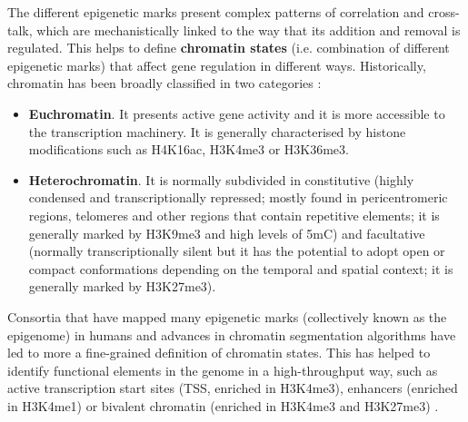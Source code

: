 The different epigenetic marks present complex patterns of correlation and cross-talk, which are mechanistically linked to the way that its addition and removal is regulated. This helps to define \textbf{chromatin states} (i.e. combination of different epigenetic marks) that affect gene regulation in different ways. Historically, chromatin has been broadly classified in two categories \cite{Allis2016,Reinberg2018,Trojer2007}:

\begin{itemize}
	
	\item \textbf{Euchromatin}. It presents active gene activity and it is more accessible to the transcription machinery. It is generally characterised by histone modifications such as H4K16ac, H3K4me3 or H3K36me3.
	
	\item \textbf{Heterochromatin}. It is normally subdivided in constitutive (highly condensed and transcriptionally repressed; mostly found in pericentromeric regions, telomeres and other regions that contain repetitive elements; it is generally marked by H3K9me3 and high levels of \acrshort{5mC}) and facultative (normally transcriptionally silent but it has the potential to adopt open or compact conformations depending on the temporal and spatial context; it is generally marked by H3K27me3).
	
\end{itemize}

Consortia that have mapped many epigenetic marks (collectively known as the epigenome) in humans \cite{Consortium2012, Consortium2015} and advances in chromatin segmentation algorithms \cite{Ernst2010} have led to more a fine-grained definition of chromatin states. This has helped to identify functional elements in the genome in a high-throughput way, such as active transcription start sites (\acrshort{TSS}, enriched in H3K4me3), enhancers (enriched in H3K4me1) or bivalent chromatin (enriched in H3K4me3 and H3K27me3) \cite{Consortium2012, Consortium2015}. 

\bigskip

